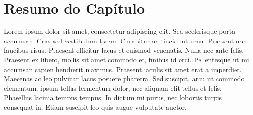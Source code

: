 \section{Resumo do Capítulo}
\label{res-resumo}
Lorem ipsum dolor sit amet, consectetur adipiscing elit. Sed scelerisque porta accumsan. Cras sed vestibulum lorem. Curabitur ac tincidunt urna. Praesent non faucibus risus. Praesent efficitur lacus et euismod venenatis. Nulla nec ante felis. Praesent ex libero, mollis sit amet commodo et, finibus id orci. Pellentesque ut mi accumsan sapien hendrerit maximus. Praesent iaculis sit amet erat a imperdiet. Maecenas ac leo pulvinar lacus posuere pharetra. Sed suscipit, arcu ut commodo elementum, ipsum tellus fermentum dolor, nec aliquam elit tellus et felis. Phasellus lacinia tempus tempus. In dictum mi purus, nec lobortis turpis consequat in. Etiam suscipit leo quis augue vulputate auctor.